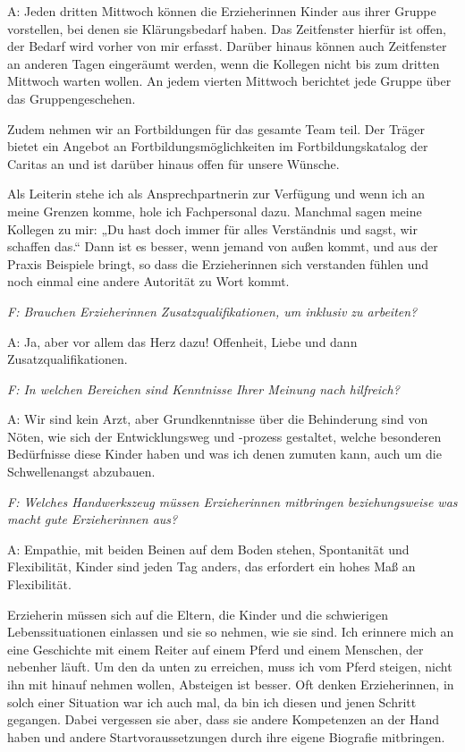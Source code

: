 A: Jeden dritten Mittwoch können die Erzieherinnen Kinder aus ihrer Gruppe vorstellen, bei denen sie Klärungsbedarf haben. Das Zeitfenster hierfür ist offen, der Bedarf wird vorher von mir erfasst. Darüber hinaus können auch Zeitfenster an anderen Tagen eingeräumt werden, wenn die Kollegen nicht bis zum dritten Mittwoch warten wollen. An jedem vierten Mittwoch berichtet jede Gruppe über das Gruppengeschehen.

Zudem nehmen wir an Fortbildungen für das gesamte Team teil. Der Träger bietet ein Angebot an Fortbildungsmöglichkeiten im Fortbildungskatalog der Caritas an und ist darüber hinaus offen für unsere Wünsche.

Als Leiterin stehe ich als Ansprechpartnerin zur Verfügung und wenn ich an meine Grenzen komme, hole ich Fachpersonal dazu. Manchmal sagen meine Kollegen zu mir: „Du hast doch immer für alles Verständnis und sagst, wir schaffen das.“ Dann ist es besser, wenn jemand von außen kommt, und aus der Praxis Beispiele bringt, so dass die Erzieherinnen sich verstanden fühlen und noch einmal eine andere Autorität zu Wort kommt. 

\emph{F: Brauchen Erzieherinnen Zusatzqualifikationen, um inklusiv zu arbeiten?} 

A: Ja, aber vor allem das Herz dazu! Offenheit, Liebe und dann Zusatzqualifikationen. 

\emph{F: In welchen Bereichen sind Kenntnisse Ihrer Meinung nach hilfreich?}

A: Wir sind kein Arzt, aber Grundkenntnisse über die Behinderung sind von Nöten, wie sich der Entwicklungsweg und -prozess gestaltet, welche besonderen Bedürfnisse diese Kinder haben und was ich denen zumuten kann, auch um die Schwellenangst abzubauen.

\emph{F: Welches Handwerkszeug müssen Erzieherinnen mitbringen beziehungsweise was macht gute Erzieherinnen aus?}

A: Empathie, mit beiden Beinen auf dem Boden stehen, Spontanität und Flexibilität, Kinder sind jeden Tag anders, das erfordert ein hohes Maß an Flexibilität.

Erzieherin müssen sich auf die Eltern, die Kinder und die schwierigen Lebenssituationen einlassen und sie so nehmen, wie sie sind. Ich erinnere mich an eine Geschichte mit einem Reiter auf einem Pferd und einem Menschen, der nebenher läuft. Um den da unten zu erreichen, muss ich vom Pferd steigen, nicht ihn mit hinauf nehmen wollen, Absteigen ist besser. Oft denken Erzieherinnen, in solch einer Situation war ich auch mal, da bin ich diesen und jenen Schritt gegangen. Dabei vergessen sie aber, dass sie andere Kompetenzen an der Hand haben und andere Startvoraussetzungen durch ihre eigene Biografie mitbringen. 

